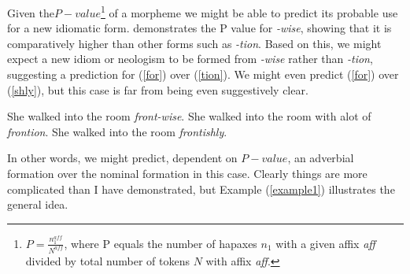 \documentclass{article}
\begin{document}
\begin{example}\label{example1} Given the$P-value$\footnote{$P = \frac{n_1^{aff}}{N^{aff}}$, where P equals the number of hapaxes $n_1$ with a given affix {\sl aff} divided by total number of tokens $N$ with affix {\sl aff}.} of a morpheme we might be able to predict its probable use for a new idiomatic form. \cite{plagproductive04} demonstrates the P value for \textsl{-wise}, showing that it is comparatively higher than other forms such as \textsl{-tion}. Based on this, we might expect a new idiom or neologism to be formed from \textsl{-wise} rather than \textsl{-tion}, suggesting a prediction for (\ref{for}) over (\ref{tion}). We might even predict (\ref{for}) over (\ref{shly}), but this case is far from being even suggestively clear.
\begin{exe}
\ex She walked into the room \textsl{front-wise}.\label{for}
\ex She walked into the room with alot of \textsl{frontion}.\label{tion}
\ex She walked into the room \textsl{frontishly}.\label{shly}
\end{exe}
\end{example}

In other words, we might predict, dependent on $P-value$, an adverbial formation over the nominal formation in this case. Clearly things are more complicated than I have demonstrated, but Example (\ref{example1}) illustrates the general idea.    
\end{document}
